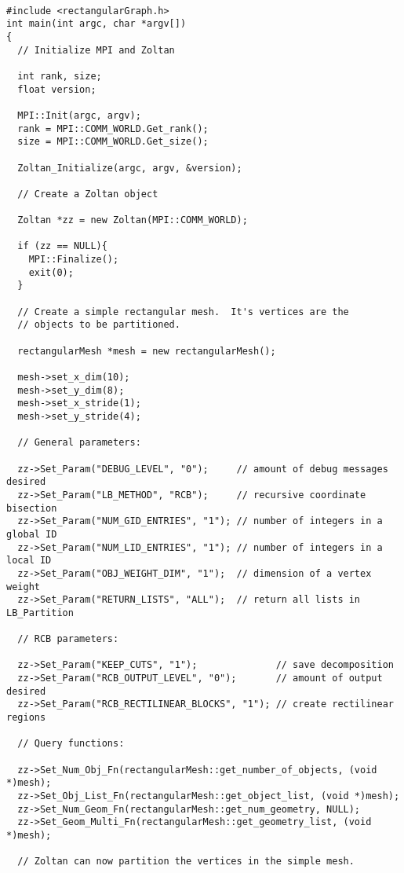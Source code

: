 \clearpage
\begin{flushleft}
\begin{verbatim}

#include <rectangularGraph.h>
int main(int argc, char *argv[])
{
  // Initialize MPI and Zoltan

  int rank, size;
  float version;

  MPI::Init(argc, argv);
  rank = MPI::COMM_WORLD.Get_rank();
  size = MPI::COMM_WORLD.Get_size();

  Zoltan_Initialize(argc, argv, &version);

  // Create a Zoltan object 
  
  Zoltan *zz = new Zoltan(MPI::COMM_WORLD);

  if (zz == NULL){
    MPI::Finalize();
    exit(0);
  }

  // Create a simple rectangular mesh.  It's vertices are the
  // objects to be partitioned.

  rectangularMesh *mesh = new rectangularMesh();

  mesh->set_x_dim(10);
  mesh->set_y_dim(8);
  mesh->set_x_stride(1);
  mesh->set_y_stride(4);

  // General parameters:

  zz->Set_Param("DEBUG_LEVEL", "0");     // amount of debug messages desired
  zz->Set_Param("LB_METHOD", "RCB");     // recursive coordinate bisection
  zz->Set_Param("NUM_GID_ENTRIES", "1"); // number of integers in a global ID
  zz->Set_Param("NUM_LID_ENTRIES", "1"); // number of integers in a local ID
  zz->Set_Param("OBJ_WEIGHT_DIM", "1");  // dimension of a vertex weight
  zz->Set_Param("RETURN_LISTS", "ALL");  // return all lists in LB_Partition

  // RCB parameters:

  zz->Set_Param("KEEP_CUTS", "1");              // save decomposition
  zz->Set_Param("RCB_OUTPUT_LEVEL", "0");       // amount of output desired
  zz->Set_Param("RCB_RECTILINEAR_BLOCKS", "1"); // create rectilinear regions

  // Query functions:

  zz->Set_Num_Obj_Fn(rectangularMesh::get_number_of_objects, (void *)mesh);
  zz->Set_Obj_List_Fn(rectangularMesh::get_object_list, (void *)mesh);
  zz->Set_Num_Geom_Fn(rectangularMesh::get_num_geometry, NULL);
  zz->Set_Geom_Multi_Fn(rectangularMesh::get_geometry_list, (void *)mesh);
  
  // Zoltan can now partition the vertices in the simple mesh.


\end{verbatim}
\end{flushleft}

